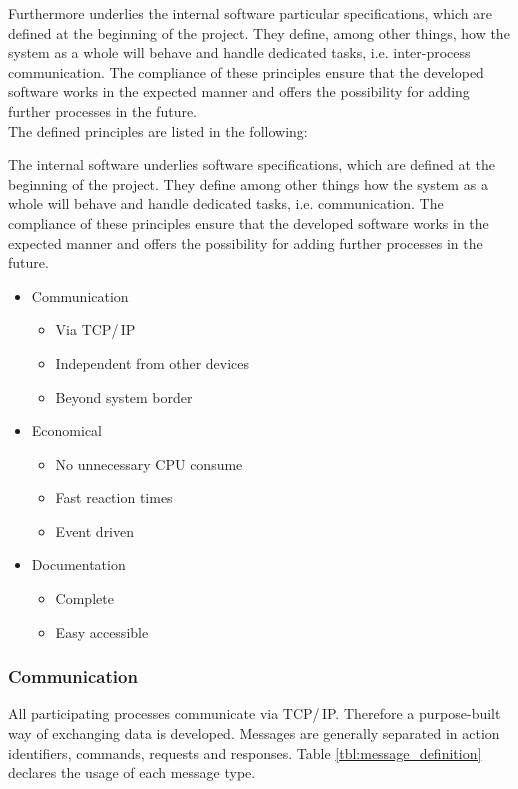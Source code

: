 Furthermore underlies the internal software particular specifications, which are defined at the beginning of the project. They define, among other things, how the system as a whole will behave and handle dedicated tasks, i.e. inter-process communication. The compliance of these principles ensure that the developed software works in the expected manner and offers the possibility for adding further processes in the future.\\

The defined principles are listed in the following:

The internal software underlies software specifications, which are defined at the beginning of the project. They define among other things how the system as a whole will behave and handle dedicated tasks, i.e. communication. The compliance of these principles ensure that the developed software works in the expected manner and offers the possibility for adding further processes in the future.


\begin{itemize}
\itemsep0em
\item Communication
	\begin{itemize}
	\item Via TCP/\,IP
	\item Independent from other devices
	\item Beyond system border
	\end{itemize}
	
\item Economical
	\begin{itemize}
	\item No unnecessary CPU consume
	\item Fast reaction times
	\item Event driven
	\end{itemize}
	
\item Documentation
	\begin{itemize}
	\item Complete
	\item Easy accessible
	\end{itemize}
\end{itemize}

\subsubsection{Communication}

All participating processes communicate via TCP/\,IP. Therefore a purpose-built way of exchanging data is developed. Messages are generally separated in action identifiers, commands, requests and responses. Table \ref{tbl:message_definition} declares the usage of each message type.\\ 

